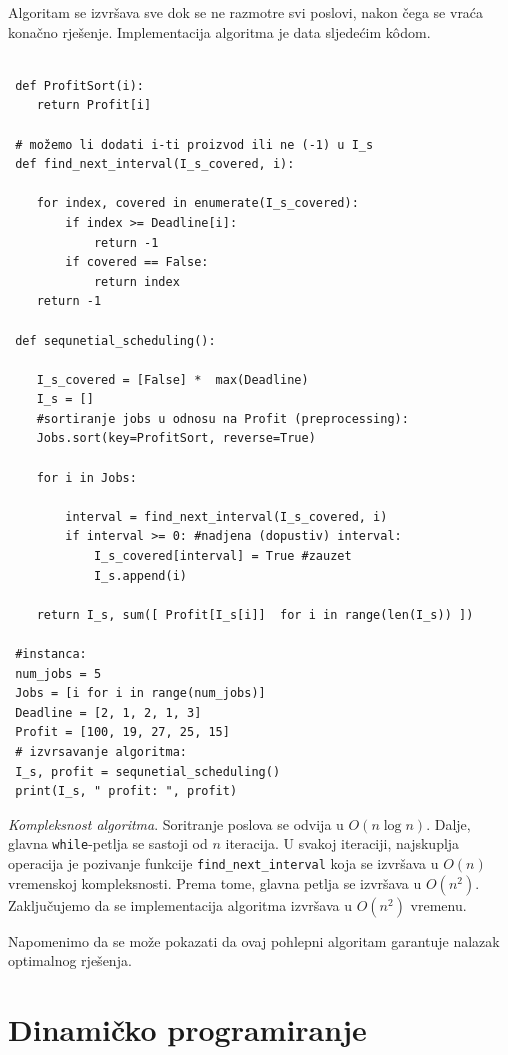Algoritam se izvršava sve dok se ne razmotre svi poslovi, nakon čega se vraća konačno rješenje. Implementacija algoritma je data sljedećim k\^odom. 
 
 \begin{verbatim}
 
 def ProfitSort(i):
 	return Profit[i]
 
 # možemo li dodati i-ti proizvod ili ne (-1) u I_s
 def find_next_interval(I_s_covered, i):
 
 	for index, covered in enumerate(I_s_covered):
 		if index >= Deadline[i]:
 			return -1
 		if covered == False:
 			return index
 	return -1        
 
 def sequnetial_scheduling():
 
 	I_s_covered = [False] *  max(Deadline) 
 	I_s = []
 	#sortiranje jobs u odnosu na Profit (preprocessing):
 	Jobs.sort(key=ProfitSort, reverse=True)

 	for i in Jobs:
 
 		interval = find_next_interval(I_s_covered, i)
 		if interval >= 0: #nadjena (dopustiv) interval:
 			I_s_covered[interval] = True #zauzet
 			I_s.append(i)
 
 	return I_s, sum([ Profit[I_s[i]]  for i in range(len(I_s)) ])
 
 #instanca:
 num_jobs = 5
 Jobs = [i for i in range(num_jobs)]
 Deadline = [2, 1, 2, 1, 3]
 Profit = [100, 19, 27, 25, 15]
 # izvrsavanje algoritma:
 I_s, profit = sequnetial_scheduling()
 print(I_s, " profit: ", profit)
 \end{verbatim}

\textit{Kompleksnost algoritma}. Soritranje poslova se odvija u $O(n \log n)$. Dalje, glavna \texttt{while}-petlja se sastoji od $n$ iteracija. U svakoj iteraciji, najskuplja operacija je pozivanje funkcije \texttt{find\_next\_interval} koja se izvršava u $O(n)$ vremenskoj kompleksnosti. Prema tome,   glavna petlja se izvršava u $O(n^2)$. Zaključujemo da se implementacija algoritma izvršava u $O(n^2)$ vremenu. 

Napomenimo da se može pokazati da ovaj pohlepni algoritam garantuje nalazak optimalnog rješenja.

\section{Dinamičko programiranje} 

